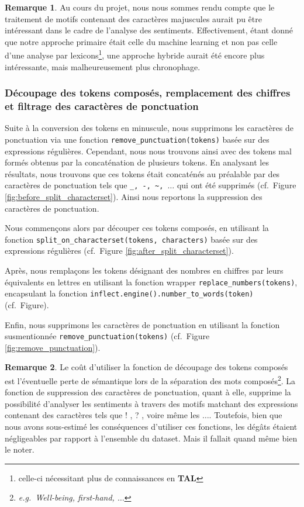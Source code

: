 \documentclass[12pt,a4paper]{report}
\theoremstyle{definition}
\newtheorem*{remark}{Remarque}
\begin{document}
\begin{remark}
  Au cours du projet, nous nous sommes rendu compte que le traitement de motifs contenant des caractères majuscules aurait pu être intéressant dans le cadre de l'analyse des sentiments. Effectivement, étant donné que notre approche primaire était celle du machine learning et non pas celle d'une analyse par lexicons\footnote{celle-ci nécessitant plus de connaissances en \textbf{TAL}}, une approche hybride aurait été encore plus intéressante, mais malheureusement plus chronophage.
\end{remark}

\subsubsection{Découpage des tokens composés, remplacement des chiffres et filtrage des caractères de ponctuation}
Suite à la conversion des tokens en minuscule, nous supprimons les caractères de ponctuation via une fonction \texttt{remove\_punctuation(tokens)} basée sur des expressions régulières. Cependant, nous nous trouvons ainsi avec des tokens mal formés obtenus par la concaténation de plusieurs tokens. En analysant les résultats, nous trouvons que ces tokens était concaténés au préalable par des caractères de ponctuation tels que \texttt{\_, -, \textasciitilde, $\dots$} qui ont été supprimés (cf.~Figure \ref{fig:before_split_characterset}). Ainsi nous reportons la suppression des caractères de ponctuation.

Nous commençons alors par découper ces tokens composés, en utilisant la fonction \texttt{split\_on\_characterset(tokens, characters)} basée sur des expressions régulières (cf.~Figure \ref{fig:after_split_characterset}).

Après, nous remplaçons les tokens désignant des nombres en chiffres par leurs équivalents en lettres en utilisant la fonction wrapper \texttt{replace\_numbers(tokens)}, encapsulant la fonction \texttt{inflect.engine().number\_to\_words(token)} (cf.~Figure).

Enfin, nous supprimons les caractères de ponctuation en utilisant la fonction susmentionnée \texttt{remove\_punctuation(tokens)} (cf.~Figure \ref{fig:remove_punctuation}).

\begin{remark}
  Le coût d'utiliser la fonction de découpage des tokens composés est l'éventuelle perte de sémantique lors de la séparation des mots composés\footnote{\emph{e.g.~Well-being, first-hand, $\dots$}}. La fonction de suppression des caractères de ponctuation, quant à elle, supprime la possibilité d'analyser les sentiments à travers des motifs matchant des expressions contenant des caractères tels que \og ! \fg, \og ? \fg, voire même les $\dots$. Toutefois, bien que nous avons sous-estimé les conséquences d'utiliser ces fonctions, les dégâts étaient négligeables par rapport à l'ensemble du dataset. Mais il fallait quand même bien le noter.
\end{remark}
\end{document}
